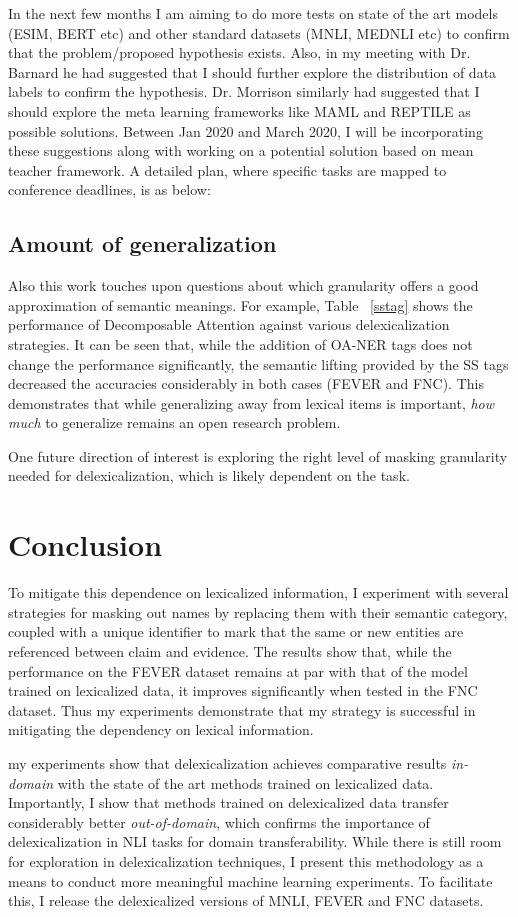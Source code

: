 \documentclass[compsoc,onecolumn]{IEEEtran}
\begin{document}
In the next few months I am aiming to do more tests on state of the art models (ESIM, BERT etc) and other standard datasets (MNLI, MEDNLI etc)  to confirm that the problem/proposed hypothesis exists. Also, in my meeting with Dr. Barnard he had suggested that I should further explore the distribution of data labels to confirm the hypothesis. Dr. Morrison similarly had suggested that I should explore the meta learning frameworks like MAML and REPTILE as possible solutions. Between Jan 2020 and March 2020, I will be incorporating these suggestions along with working on a potential solution based on mean teacher framework. A detailed plan, where specific tasks are mapped to conference deadlines, is as below:

\subsection{Amount of generalization}
Also this work touches upon questions about which granularity offers a good approximation of semantic meanings. For example, Table ~\ref{sstag} shows the performance of Decomposable Attention against various delexicalization strategies. It can be seen that, while the addition of OA-NER tags does not change the performance significantly, the semantic lifting provided by the SS tags decreased the accuracies considerably in both cases (FEVER and FNC).  This demonstrates that while generalizing away from lexical items is important, {\em how much} to generalize remains an open research problem.

One future direction of interest is exploring the right level of masking granularity needed for delexicalization, which is likely dependent on the task. 

\section{Conclusion}
 To mitigate this dependence on lexicalized information, I experiment with several strategies for masking out names by replacing them with their semantic category, coupled with a unique identifier to mark that the same or new entities are referenced between claim and evidence. The results show that, while the performance on the FEVER dataset remains at par with that of the model trained on lexicalized data, it improves significantly when tested in the FNC dataset. Thus my experiments demonstrate that my strategy is successful in mitigating the dependency on lexical information.

my experiments show that delexicalization achieves comparative results {\em in-domain} with the state of the art methods trained on lexicalized data. Importantly, I show that methods trained on delexicalized data transfer considerably better {\em out-of-domain}, which  confirms the importance of delexicalization in NLI tasks for domain transferability. While there is still room for exploration in delexicalization techniques, I present this methodology as a means  to conduct more meaningful machine learning experiments. To facilitate this, I release the delexicalized versions of MNLI, FEVER and FNC datasets.





\balance
\begin{spacing}{0.88}
%


\end{spacing}

\end{document}
